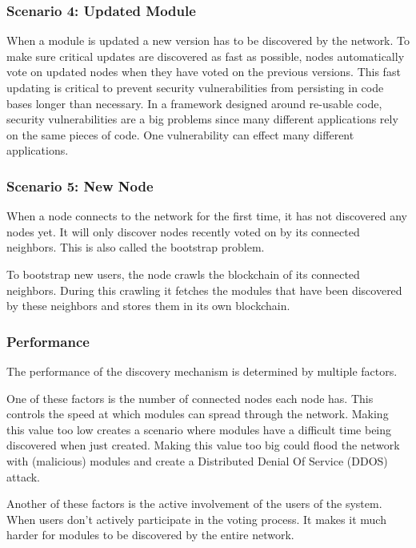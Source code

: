 \subsubsection{\textbf{Scenario 4: Updated Module}}

When a module is updated a new version has to be discovered by the network. To make sure critical updates are discovered as fast as possible, nodes automatically vote on updated nodes when they have voted on the previous versions. This fast updating is critical to prevent security vulnerabilities from persisting in code bases longer than necessary. In a framework designed around re-usable code, security vulnerabilities are a big problems since many different applications rely on the same pieces of code. One vulnerability can effect many different applications. 

\subsubsection{\textbf{Scenario 5: New Node}}

When a node connects to the network for the first time, it has not discovered any nodes yet. It will only discover nodes recently voted on by its connected neighbors. This is also called the bootstrap problem.

To bootstrap new users, the node crawls the blockchain of its connected neighbors. During this crawling it fetches the modules that have been discovered by these neighbors and stores them in its own blockchain.

\subsubsection{\textbf{Performance}}

The performance of the discovery mechanism is determined by multiple factors.

One of these factors is the number of connected nodes each node has. This controls the speed at which modules can spread through the network. Making this value too low creates a scenario where modules have a difficult time being discovered when just created. Making this value too big could flood the network with (malicious) modules and create a Distributed Denial Of Service (DDOS) attack.

Another of these factors is the active involvement of the users of the system. When users don't actively participate in the voting process. It makes it much harder for modules to be discovered by the entire network.

